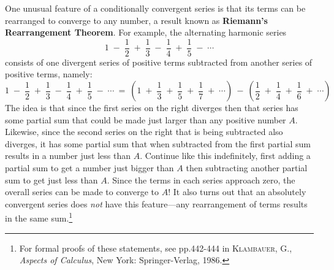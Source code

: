 \label{cmnt:absdiv}
\newpage
One unusual feature of a conditionally convergent series is that its terms can
be rearranged to converge to any number, a result known as \textbf{Riemann's
Rearrangement Theorem}. For example, the
alternating harmonic series
\[
1 \;-\; \frac{1}{2} \;+\; \frac{1}{3} \;-\; \frac{1}{4} \;+\;
\frac{1}{5} \;-\; \cdots
\]
consists of one divergent series of positive terms subtracted from another
series of positive terms, namely:
\[
1 \;-\; \frac{1}{2} \;+\; \frac{1}{3} \;-\; \frac{1}{4} \;+\;
\frac{1}{5} \;-\; \cdots ~=~
\left(1 \;+\; \frac{1}{3} \;+\; \frac{1}{5} \;+\; \frac{1}{7} \;+\; \cdots\right) ~-~
\left(\frac{1}{2} \;+\; \frac{1}{4} \;+\; \frac{1}{6} \;+\; \cdots\right)
\]
The idea is that since the first series on the right diverges then that series
has some partial sum that could be made just larger than any positive number
$A$. Likewise, since the second series on the right that is being subtracted
also diverges, it has some partial sum that when subtracted from the first
partial sum results in a number just less than $A$. Continue like this
indefinitely, first adding a partial sum to get a number just bigger than $A$
then subtracting another partial sum to get just less than $A$. Since the terms
in each series approach zero, the overall series can be made to converge to $A$!
It also turns out that an absolutely convergent series does
\emph{not} have this feature---any rearrangement of terms results in the same
sum.\footnote{For formal proofs of these statements, see pp.442-444 in
\textsc{Klambauer, G.}, \emph{Aspects of Calculus}, New York: Springer-Verlag,
1986.}

